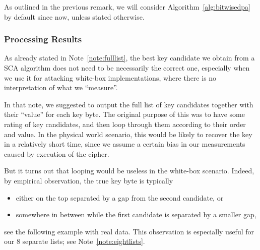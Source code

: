 As outlined in the previous remark, we will consider Algorithm~\ref{alg:bitwisedpa} by default since now, unless stated otherwise.

\subsubsection{Processing Results}
	
	As already stated in Note~\ref{note:fulllist}, the best key candidate we obtain from a SCA algorithm does not need to be necessarily the correct one, especially when we use it for attacking white-box implementations, where there is no interpretation of what we ``measure''.
	
	In that note, we suggested to output the full list of key candidates together with their ``value'' for each key byte. The original purpose of this was to have some rating of key candidates, and then loop through them according to their order and value. In the physical world scenario, this would be likely to recover the key in a relatively short time, since we assume a certain bias in our measurements caused by execution of the cipher.
	
	But it turns out that looping would be useless in the white-box scenario. Indeed, by empirical observation, the true key byte is typically
	\begin{itemize}
		\item either on the top separated by a gap from the second candidate, or
		\item somewhere in between while the first candidate is separated by a smaller gap,
	\end{itemize}
	see the following example with real data. This observation is especially useful for our $8$ separate lists; see Note~\ref{note:eightlists}.
	
